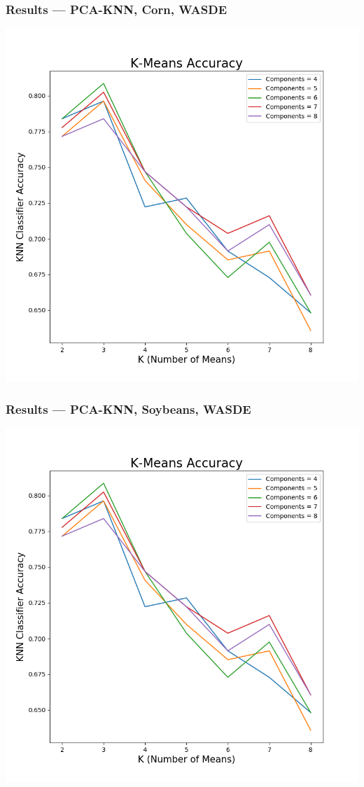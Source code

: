 \documentclass{beamer}
\begin{document}
\begin{frame}
\frametitle{Results --- PCA-KNN, Corn, WASDE}
\begin{center}
\includegraphics[scale=.4]{images/cornacc4,8,w}
\end{center}
\end{frame}

\begin{frame}
\frametitle{Results ---  PCA-KNN, Soybeans, WASDE}
\begin{center}
\includegraphics[scale=.4]{images/soyacc4,8,w}
\end{center}
\end{frame}
\end{document}
